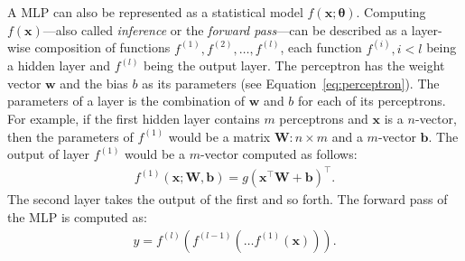 \documentclass[]{article}
\begin{document}
A MLP can also be represented as a statistical model
$f(\mathbf{x};\mathbf{\theta})$.
Computing $f(\mathbf{x})$---also called \textit{inference} or the
\textit{forward pass}---can be described as a layer-wise composition
of functions $f^{(1)}, f^{(2)}, \dots, f^{(l)}$, each function
$f^{(i)}, i < l$ being a hidden layer and $f^{(l)}$ being the output
layer.
The perceptron has the weight vector $\mathbf{w}$ and the bias
$b$ as its parameters (see Equation~\ref{eq:perceptron}).
The parameters of a layer is the combination of
$\mathbf{w}$ and $b$ for each of its perceptrons.
For example, if the first hidden layer contains $m$ perceptrons and
$\mathbf{x}$ is a $n$-vector, then the parameters of $f^{(1)}$ would
be a matrix $\mathbf{W}: n \times m$ and a $m$-vector $\mathbf{b}$.
The output of layer $f^{(1)}$ would be a $m$-vector computed as
follows:
\begin{align}
  f^{(1)}(\mathbf{x}; \mathbf{W}, \mathbf{b}) =
  g(\mathbf{x}^\top \mathbf{W} + \mathbf{b})^\top.
\end{align}
The second layer takes the output of the first and so forth.
The forward pass of the MLP is computed as:
\begin{align}
  y = f^{(l)}(f^{(l-1)}(\dots f^{(1)}(\mathbf{x}))).
\end{align}
\end{document}
